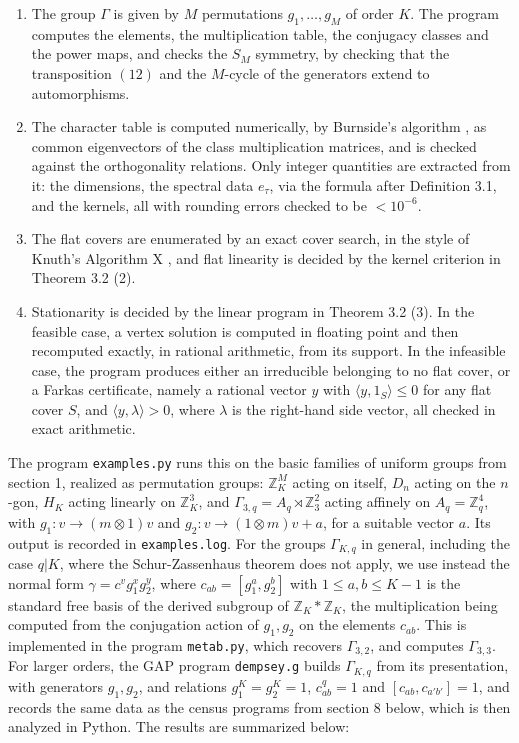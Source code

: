 \documentclass[12pt]{amsart}
\theoremstyle{definition}
\begin{document}
\begin{enumerate}
\item The group $\Gamma$ is given by $M$ permutations $g_1,\ldots,g_M$ of order $K$. The program computes the elements, the multiplication table, the conjugacy classes and the power maps, and checks the $S_M$ symmetry, by checking that the transposition $(12)$ and the $M$-cycle of the generators extend to automorphisms.

\item The character table is computed numerically, by Burnside's algorithm \cite{bur,dix}, as common eigenvectors of the class multiplication matrices, and is checked against the orthogonality relations. Only integer quantities are extracted from it: the dimensions, the spectral data $e_\tau$, via the formula after Definition 3.1, and the kernels, all with rounding errors checked to be $<10^{-6}$.

\item The flat covers are enumerated by an exact cover search, in the style of Knuth's Algorithm X \cite{knu}, and flat linearity is decided by the kernel criterion in Theorem 3.2 (2).

\item Stationarity is decided by the linear program in Theorem 3.2 (3). In the feasible case, a vertex solution is computed in floating point and then recomputed exactly, in rational arithmetic, from its support. In the infeasible case, the program produces either an irreducible belonging to no flat cover, or a Farkas certificate, namely a rational vector $y$ with $\langle y,1_S\rangle\leq0$ for any flat cover $S$, and $\langle y,\lambda\rangle>0$, where $\lambda$ is the right-hand side vector, all checked in exact arithmetic.
\end{enumerate}

The program {\tt examples.py} runs this on the basic families of uniform groups from section 1, realized as permutation groups: $\mathbb Z_K^M$ acting on itself, $D_n$ acting on the $n$-gon, $H_K$ acting linearly on $\mathbb Z_K^3$, and $\Gamma_{3,q}=A_q\rtimes\mathbb Z_3^2$ acting affinely on $A_q=\mathbb Z_q^4$, with $g_1:v\to(m\otimes1)v$ and $g_2:v\to(1\otimes m)v+a$, for a suitable vector $a$. Its output is recorded in {\tt examples.log}. For the groups $\Gamma_{K,q}$ in general, including the case $q|K$, where the Schur-Zassenhaus theorem does not apply, we use instead the normal form $\gamma=c^vg_1^xg_2^y$, where $c_{ab}=[g_1^a,g_2^b]$ with $1\leq a,b\leq K-1$ is the standard free basis of the derived subgroup of $\mathbb Z_K*\mathbb Z_K$, the multiplication being computed from the conjugation action of $g_1,g_2$ on the elements $c_{ab}$. This is implemented in the program {\tt metab.py}, which recovers $\Gamma_{3,2}$, and computes $\Gamma_{3,3}$. For larger orders, the GAP program {\tt dempsey.g} builds $\Gamma_{K,q}$ from its presentation, with generators $g_1,g_2$, and relations $g_1^K=g_2^K=1$, $c_{ab}^q=1$ and $[c_{ab},c_{a'b'}]=1$, and records the same data as the census programs from section 8 below, which is then analyzed in Python. The results are summarized below:
\end{document}
